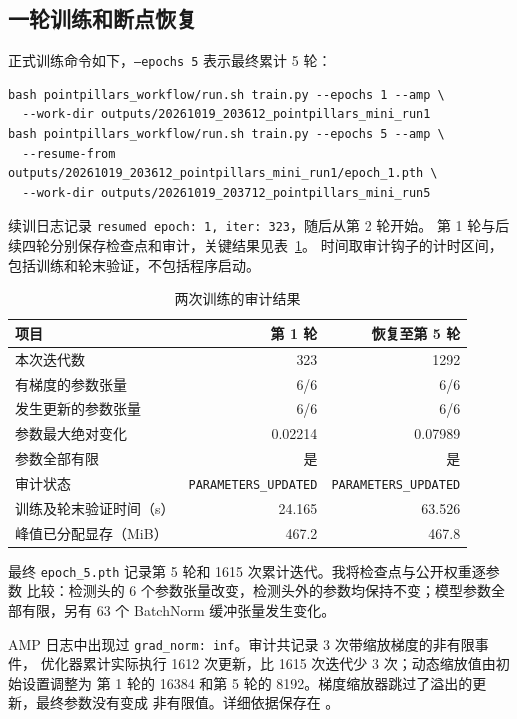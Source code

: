 \documentclass[UTF8,zihao=5,scheme=chinese]{ctexart}
\begin{document}
\subsection{一轮训练和断点恢复}

正式训练命令如下，\texttt{--epochs 5} 表示最终累计 5 轮：

\begin{verbatim}
bash pointpillars_workflow/run.sh train.py --epochs 1 --amp \
  --work-dir outputs/20261019_203612_pointpillars_mini_run1
bash pointpillars_workflow/run.sh train.py --epochs 5 --amp \
  --resume-from outputs/20261019_203612_pointpillars_mini_run1/epoch_1.pth \
  --work-dir outputs/20261019_203712_pointpillars_mini_run5
\end{verbatim}

续训日志记录 \texttt{resumed epoch: 1, iter: 323}，随后从第 2 轮开始。
第 1 轮与后续四轮分别保存检查点和审计，关键结果见表~\ref{tab:audit}。
时间取审计钩子的计时区间，包括训练和轮末验证，不包括程序启动。

\begin{table}[htbp]
  \centering
  \caption{两次训练的审计结果}
  \label{tab:audit}
  \begin{tabular}{lrr}
    \toprule
    项目 & 第 1 轮 & 恢复至第 5 轮 \\
    \midrule
    本次迭代数 & 323 & 1292 \\
    有梯度的参数张量 & 6/6 & 6/6 \\
    发生更新的参数张量 & 6/6 & 6/6 \\
    参数最大绝对变化 & 0.02214 & 0.07989 \\
    参数全部有限 & 是 & 是 \\
    审计状态 & \texttt{PARAMETERS\_UPDATED} & \texttt{PARAMETERS\_UPDATED} \\
    训练及轮末验证时间（s） & 24.165 & 63.526 \\
    峰值已分配显存（MiB） & 467.2 & 467.8 \\
    \bottomrule
  \end{tabular}
\end{table}

最终 \texttt{epoch\_5.pth} 记录第 5 轮和 1615 次累计迭代。我将检查点与公开权重逐参数
比较：检测头的 6 个参数张量改变，检测头外的参数均保持不变；模型参数全部有限，另有
63 个 BatchNorm 缓冲张量发生变化。

AMP 日志中出现过 \texttt{grad\_norm: inf}。审计共记录 3 次带缩放梯度的非有限事件，
优化器累计实际执行 1612 次更新，比 1615 次迭代少 3 次；动态缩放值由初始设置调整为
第 1 轮的 16384 和第 5 轮的 8192。梯度缩放器跳过了溢出的更新，最终参数没有变成
非有限值。详细依据保存在 。
\end{document}
